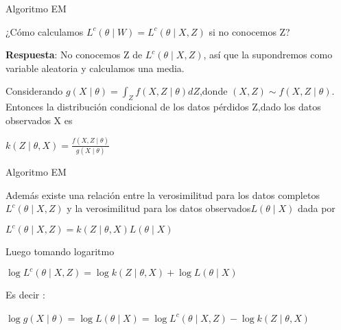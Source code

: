 \documentclass[utf8,spanish,xcolor={table,dvipsnames},12pt]{beamer}
\begin{document}
\begin{frame}{Algoritmo EM}
	
 ¿Cómo calculamos $L^{c}(\theta\mid W)=L^{c}(\theta\mid X,Z)$ si no conocemos Z?
 
 \vspace{0.4cm}
 
 \textbf{Respuesta}: No conocemos Z de $L^{c}(\theta\mid X,Z)$, así que la supondremos como variable aleatoria y calculamos una media.
 
 \vspace{0.2cm}
 
Considerando $g(X\mid\theta)=\int_{Z}f(X,Z\mid\theta)dZ$,donde $(X,Z)\sim f(X,Z\mid\theta)$. Entonces la distribución condicional de los datos pérdidos Z,dado los datos observados X es

\vspace{0.2cm}

\begin{center}
  $k(Z\mid\theta,X)=\frac{f(X,Z\mid\theta)}{g(X\mid\theta)}$
\end{center}


\end{frame}


\begin{frame}{Algoritmo EM}

Además existe una relación entre la verosimilitud para los datos completos $L^{c}(\theta\mid X,Z)$ y la verosimilitud para los datos observados$L(\theta\mid X)$ dada por

\begin{center}
	$L^{c}(\theta\mid X,Z)=k(Z\mid\theta,X)L(\theta\mid X)$
\end{center}
Luego tomando logaritmo


\begin{center}
	$\log L^{c}(\theta\mid X,Z)=\log k(Z\mid\theta,X)+\log L(\theta\mid X)$
\end{center}

Es decir :

\vspace{0.2cm}

$\log g(X\mid\theta)=\log L(\theta\mid X)=\log L^{c}(\theta\mid X,Z)-\log k(Z\mid\theta,X) $\

\end{frame}
\end{document}
